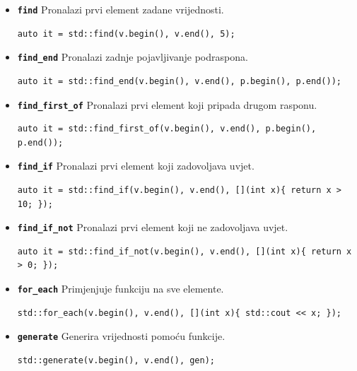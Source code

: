 \begin{itemize}
\item \textbf{\texttt{find}}\newline
Pronalazi prvi element zadane vrijednosti.
\begin{verbatim}
auto it = std::find(v.begin(), v.end(), 5);
\end{verbatim}

\item \textbf{\texttt{find\_end}}\newline
Pronalazi zadnje pojavljivanje podraspona.
\begin{verbatim}
auto it = std::find_end(v.begin(), v.end(), p.begin(), p.end());
\end{verbatim}

\item \textbf{\texttt{find\_first\_of}}\newline
Pronalazi prvi element koji pripada drugom rasponu.
\begin{verbatim}
auto it = std::find_first_of(v.begin(), v.end(), p.begin(), p.end());
\end{verbatim}

\item \textbf{\texttt{find\_if}}\newline
Pronalazi prvi element koji zadovoljava uvjet.
\begin{verbatim}
auto it = std::find_if(v.begin(), v.end(), [](int x){ return x > 10; });
\end{verbatim}

\item \textbf{\texttt{find\_if\_not}}\newline
Pronalazi prvi element koji ne zadovoljava uvjet.
\begin{verbatim}
auto it = std::find_if_not(v.begin(), v.end(), [](int x){ return x > 0; });
\end{verbatim}

\item \textbf{\texttt{for\_each}}\newline
Primjenjuje funkciju na sve elemente.
\begin{verbatim}
std::for_each(v.begin(), v.end(), [](int x){ std::cout << x; });
\end{verbatim}

\item \textbf{\texttt{generate}}\newline
Generira vrijednosti pomoću funkcije.
\begin{verbatim}
std::generate(v.begin(), v.end(), gen);
\end{verbatim}


\end{itemize}
